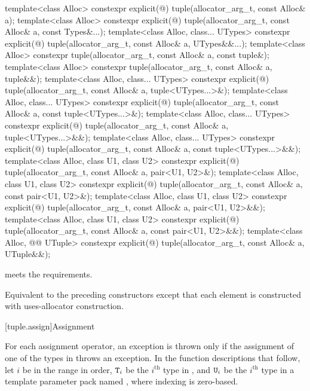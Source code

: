 %
\begin{itemdecl}
template<class Alloc>
  constexpr explicit(@\seebelow@)
    tuple(allocator_arg_t, const Alloc& a);
template<class Alloc>
  constexpr explicit(@\seebelow@)
    tuple(allocator_arg_t, const Alloc& a, const Types&...);
template<class Alloc, class... UTypes>
  constexpr explicit(@\seebelow@)
    tuple(allocator_arg_t, const Alloc& a, UTypes&&...);
template<class Alloc>
  constexpr tuple(allocator_arg_t, const Alloc& a, const tuple&);
template<class Alloc>
  constexpr tuple(allocator_arg_t, const Alloc& a, tuple&&);
template<class Alloc, class... UTypes>
  constexpr explicit(@\seebelow@)
    tuple(allocator_arg_t, const Alloc& a, tuple<UTypes...>&);
template<class Alloc, class... UTypes>
  constexpr explicit(@\seebelow@)
    tuple(allocator_arg_t, const Alloc& a, const tuple<UTypes...>&);
template<class Alloc, class... UTypes>
  constexpr explicit(@\seebelow@)
    tuple(allocator_arg_t, const Alloc& a, tuple<UTypes...>&&);
template<class Alloc, class... UTypes>
  constexpr explicit(@\seebelow@)
    tuple(allocator_arg_t, const Alloc& a, const tuple<UTypes...>&&);
template<class Alloc, class U1, class U2>
  constexpr explicit(@\seebelow@)
    tuple(allocator_arg_t, const Alloc& a, pair<U1, U2>&);
template<class Alloc, class U1, class U2>
  constexpr explicit(@\seebelow@)
    tuple(allocator_arg_t, const Alloc& a, const pair<U1, U2>&);
template<class Alloc, class U1, class U2>
  constexpr explicit(@\seebelow@)
    tuple(allocator_arg_t, const Alloc& a, pair<U1, U2>&&);
template<class Alloc, class U1, class U2>
  constexpr explicit(@\seebelow@)
    tuple(allocator_arg_t, const Alloc& a, const pair<U1, U2>&&);
template<class Alloc, @@ UTuple>
  constexpr explicit(@\seebelow@)
    tuple(allocator_arg_t, const Alloc& a, UTuple&&);
\end{itemdecl}

\begin{itemdescr}
\pnum
\expects
{} meets
the  requirements.

\pnum
\effects
Equivalent to the preceding constructors except that each element is constructed with
uses-allocator construction.
\end{itemdescr}

[tuple.assign]{Assignment}

\pnum
For each  assignment operator, an exception is thrown only if the
assignment of one of the types in  throws an exception.
In the function descriptions that follow, let $i$ be in the range 
in order, $\texttt{T}_i$ be the $i^\text{th}$ type in ,
and $\texttt{U}_i$ be the $i^\text{th}$ type in a
template parameter pack named , where indexing is zero-based.

